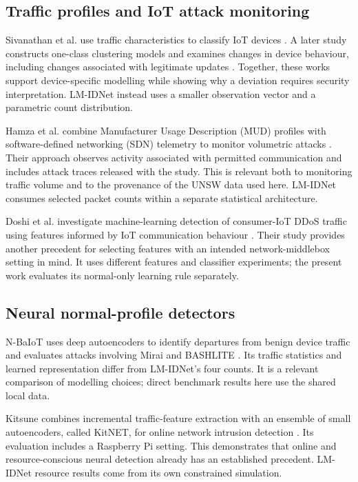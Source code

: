 \subsection{Traffic profiles and IoT attack monitoring}

Sivanathan et al. use traffic characteristics to classify IoT devices
\cite{sivanathan2019}. A later study constructs one-class clustering
models and examines changes in device behaviour, including changes
associated with legitimate updates \cite{sivanathan2020}. Together, these
works support device-specific modelling while showing why a deviation
requires security interpretation. LM-IDNet instead uses a smaller
observation vector and a parametric count distribution.

Hamza et al. combine Manufacturer Usage Description (MUD) profiles with
software-defined networking (SDN) telemetry to monitor volumetric attacks
\cite{hamza2019}. Their approach observes activity associated with
permitted communication and includes attack traces released with the
study. This is relevant both to monitoring traffic volume and to the
provenance of the UNSW data used here. LM-IDNet consumes selected packet
counts within a separate statistical architecture.

Doshi et al. investigate machine-learning detection of consumer-IoT DDoS
traffic using features informed by IoT communication behaviour
\cite{doshi2018}. Their study provides another precedent for selecting
features with an intended network-middlebox setting in mind. It uses
different features and classifier experiments; the present work evaluates
its normal-only learning rule separately.

\subsection{Neural normal-profile detectors}

N-BaIoT uses deep autoencoders to identify departures from benign device
traffic and evaluates attacks involving Mirai and BASHLITE
\cite{meidan2018}. Its traffic statistics and learned representation differ
from LM-IDNet's four counts. It is a relevant comparison of modelling
choices; direct benchmark results here use the shared local data.

Kitsune combines incremental traffic-feature extraction with an ensemble
of small autoencoders, called KitNET, for online network intrusion
detection \cite{mirsky2018}. Its evaluation includes a Raspberry Pi
setting. This demonstrates that online and resource-conscious neural
detection already has an established precedent. LM-IDNet resource results
come from its own constrained simulation.

